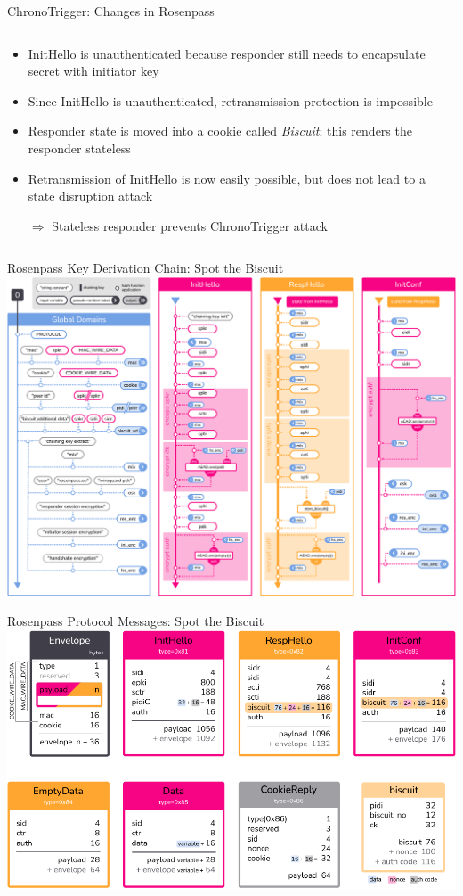 \begin{frame}{ChronoTrigger: Changes in Rosenpass}
\begin{columns}[fullwidth,c]
    \begin{column}{.56\linewidth}
      \begin{itemize}
        \item InitHello is unauthenticated because responder still needs to encapsulate secret with initiator key
        \item Since InitHello is unauthenticated, retransmission protection is impossible
        \item Responder state is moved into a cookie called \emph{Biscuit}; this renders the responder stateless
        \item Retransmission of InitHello is now easily possible, but does not lead to a state disruption attack
        \item[$\Rightarrow$] Stateless responder prevents ChronoTrigger attack
      \end{itemize}
    \end{column}
  \end{columns}
\end{frame}




\begin{frame}{Rosenpass Key Derivation Chain: Spot the Biscuit}
  \hypertarget{rosenpass-kdf-chain-spot-the-biscuit}{}
  \centering
  \includegraphics[height=.85\textheight]{graphics/rosenpass-wp-hashing-tree-rgb.pdf}
\end{frame}




\begin{frame}{Rosenpass Protocol Messages: Spot the Biscuit}
  \hypertarget{rosenpass-protocol-messages-spot-the-biscuit}{}
    \includegraphics[height=.85\textheight]{graphics/rp-messages-04-all-rgb.pdf}
\end{frame}
